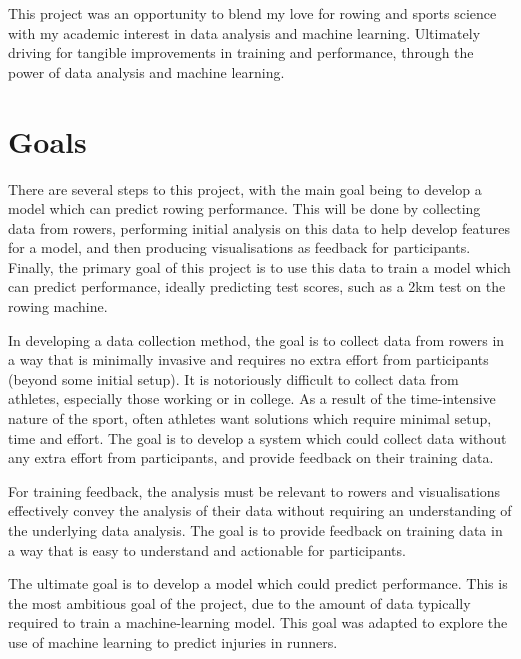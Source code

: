 This project was an opportunity to blend my love for rowing and sports science with my academic interest in data analysis and machine learning.  Ultimately driving for tangible improvements in training and performance, through the power of data analysis and machine learning.


\section{Goals}
There are several steps to this project, with the main goal being to develop a model which can predict rowing performance. This will be done by collecting data from rowers, performing initial analysis on this data to help develop features for a model, and then producing visualisations as feedback for participants. Finally, the primary goal of this project is to use this data to train a model which can predict performance, ideally predicting test scores, such as a 2km test on the rowing machine.

In developing a data collection method, the goal is to collect data from rowers in a way that is minimally invasive and requires no extra effort from participants (beyond some initial setup). It is notoriously difficult to collect data from athletes, especially those working or in college. As a result of the time-intensive nature of the sport, often athletes want solutions which require minimal setup, time and effort. The goal is to develop a system which could collect data without any extra effort from participants, and provide feedback on their training data.

For training feedback, the analysis must be relevant to rowers and visualisations effectively convey the analysis of their data without requiring an understanding of the underlying data analysis. The goal is to provide feedback on training data in a way that is easy to understand and actionable for participants.

The ultimate goal is to develop a model which could predict performance. This is the most ambitious goal of the project, due to the amount of data typically required to train a machine-learning model. This goal was adapted to explore the use of machine learning to predict injuries in runners.

